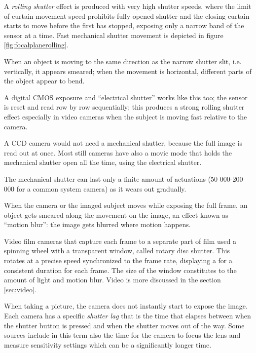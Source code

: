 A \emph{rolling shutter} effect is produced with very high shutter speeds, where the limit of curtain movement speed prohibits fully opened shutter and the closing curtain starts to move before the first has stopped, exposing only a narrow band of the sensor at a time.
Fast mechanical shutter movement is depicted in figure \ref{fig:focalplanerolling}.

When an object is moving to the same direction as the narrow shutter slit, i.e. vertically, it appears smeared;
when the movement is horizontal, different parts of the object appear to bend.


A digital CMOS exposure and ``electrical shutter'' works like this too; the sensor is reset and read row by row sequentially; this produces a strong rolling shutter effect especially in video cameras when the subject is moving fast relative to the camera.

A CCD camera would not need a mechanical shutter, because the full image is read out at once.
Most still cameras have also a movie mode that holds the mechanical shutter open all the time, using the electrical shutter.

The mechanical shutter can last only a finite amount of actuations (50 000-200 000 for a common system camera) as it wears out gradually.


When the camera or the imaged subject moves while exposing the full frame, an object gets smeared along the movement on the image, an effect known as ``motion blur'': the image gets blurred where motion happens.

Video film cameras that capture each frame to a separate part of film used a spinning wheel with a transparent window, called rotary disc shutter. \cite{wilson2004anton}
This rotates at a precise speed synchronized to the frame rate, displaying a for a consistent duration for each frame.
The size of the window constitutes to the amount of light and motion blur.
Video is more discussed in the section \ref{sec:video}.

When taking a picture, the camera does not instantly start to expose the image.
Each camera has a specific \emph{shutter lag} that is the time that elapses between when the shutter button is pressed and when the shutter moves out of the way.
Some sources include in this term also the time for the camera to focus the lens and measure sensitivity settings which can be a significantly longer time.


